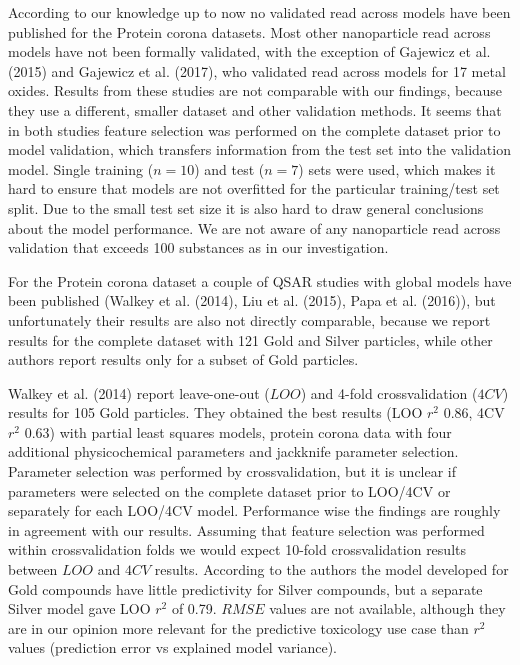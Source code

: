 \documentclass[utf8]{frontiersHLTH} %
\begin{document}
According to our knowledge up to now no validated read across models
have been published for the Protein corona datasets. Most other
nanoparticle read across models have not been formally validated, with
the exception of Gajewicz et al. (2015) and Gajewicz et al. (2017), who
validated read across models for 17 metal oxides. Results from these
studies are not comparable with our findings, because they use a
different, smaller dataset and other validation methods. It seems that
in both studies feature selection was performed on the complete dataset
prior to model validation, which transfers information from the test set
into the validation model. Single training (\(n=10\)) and test (\(n=7\))
sets were used, which makes it hard to ensure that models are not
overfitted for the particular training/test set split. Due to the small
test set size it is also hard to draw general conclusions about the
model performance. We are not aware of any nanoparticle read across
validation that exceeds 100 substances as in our investigation.

For the Protein corona dataset a couple of QSAR studies with global
models have been published (Walkey et al. (2014), Liu et al. (2015),
Papa et al. (2016)), but unfortunately their results are also not
directly comparable, because we report results for the complete dataset
with 121 Gold and Silver particles, while other authors report results
only for a subset of Gold particles.

Walkey et al. (2014) report leave-one-out (\(LOO\)) and 4-fold
crossvalidation (\(4CV\)) results for 105 Gold particles. They obtained
the best results (LOO \(r^2\) 0.86, 4CV \(r^2\) 0.63) with partial least
squares models, protein corona data with four additional physicochemical
parameters and jackknife parameter selection. Parameter selection was
performed by crossvalidation, but it is unclear if parameters were
selected on the complete dataset prior to LOO/4CV or separately for each
LOO/4CV model. Performance wise the findings are roughly in agreement
with our results. Assuming that feature selection was performed within
crossvalidation folds we would expect 10-fold crossvalidation results
between \(LOO\) and \(4CV\) results. According to the authors the model
developed for Gold compounds have little predictivity for Silver
compounds, but a separate Silver model gave LOO \(r^2\) of 0.79.
\(RMSE\) values are not available, although they are in our opinion more
relevant for the predictive toxicology use case than \(r^2\) values
(prediction error vs explained model variance).
\end{document}
